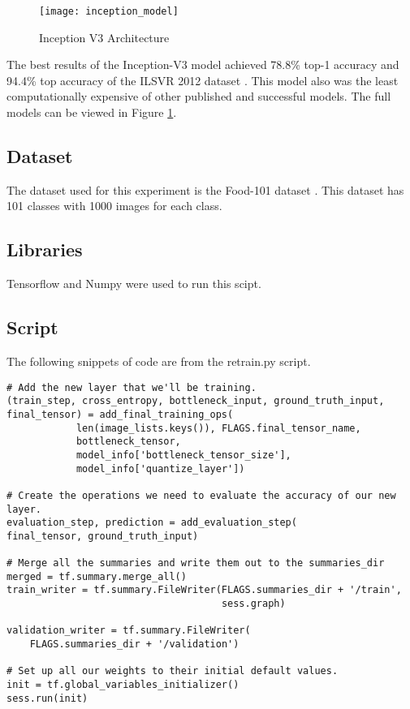 \begin{figure}
     \texttt{[image: inception\_model]}
     \caption{Inception V3 Architecture}
     \label{fig:inception_model}
\end{figure}

The best results of the Inception-V3 model achieved 78.8\% top-1 accuracy and 94.4\% top accuracy of the ILSVR 2012 dataset \textcite{rethinkingInception}.
This model also was the least computationally expensive of other published and successful models.
The full models can be viewed in Figure \ref{fig:inception_model}.

\subsection*{Dataset}
The dataset used for this experiment is the Food-101 dataset \textcite{Food
101}. This dataset has 101 classes with 1000 images for each class.

\subsection*{Libraries}
Tensorflow and Numpy were used to run this scipt.

\subsection*{Script}
The following snippets of code are from the retrain.py script.

\begin{lstlisting}
# Add the new layer that we'll be training.
(train_step, cross_entropy, bottleneck_input, ground_truth_input,
final_tensor) = add_final_training_ops(
            len(image_lists.keys()), FLAGS.final_tensor_name,
            bottleneck_tensor,
            model_info['bottleneck_tensor_size'],
            model_info['quantize_layer'])
 
# Create the operations we need to evaluate the accuracy of our new layer.
evaluation_step, prediction = add_evaluation_step(
final_tensor, ground_truth_input)
 
# Merge all the summaries and write them out to the summaries_dir
merged = tf.summary.merge_all()
train_writer = tf.summary.FileWriter(FLAGS.summaries_dir + '/train',
                                     sess.graph)
 
validation_writer = tf.summary.FileWriter(
    FLAGS.summaries_dir + '/validation')
 
# Set up all our weights to their initial default values.
init = tf.global_variables_initializer()
sess.run(init)

\end{lstlisting}




